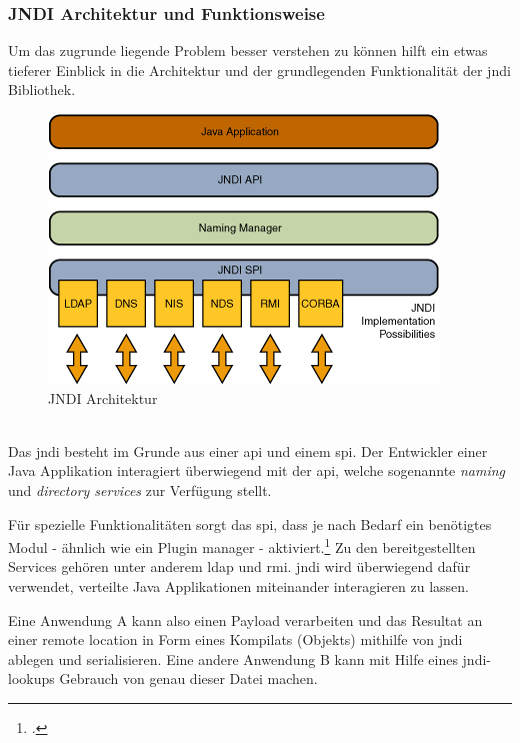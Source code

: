 \subsubsection{JNDI Architektur und Funktionsweise}

Um das zugrunde liegende Problem besser verstehen zu können hilft ein etwas tieferer Einblick in die Architektur
und der grundlegenden Funktionalität der \gls{jndi} Bibliothek.
\begin{figure}[!htb]\label{fig:jndiarch} %
    \begin{center}
        \includegraphics[scale=0.75]{images/jndiarch}
    \end{center}
    \caption{JNDI Architektur}
\end{figure}
\\
Das \gls{jndi} besteht im Grunde aus einer \gls{api} und einem \gls{spi}.
Der Entwickler einer Java Applikation interagiert überwiegend mit der \gls{api}, welche sogenannte \textit{naming} und \textit{directory services} zur Verfügung stellt.

Für spezielle Funktionalitäten sorgt das \gls{spi}, dass je nach Bedarf ein benötigtes Modul - ähnlich wie ein Plugin manager - aktiviert.\footcite{JNDIArchitektur}
Zu den bereitgestellten Services gehören unter anderem \gls{ldap} und \gls{rmi}.
\gls{jndi} wird überwiegend dafür verwendet, verteilte Java Applikationen miteinander interagieren zu lassen.

Eine Anwendung A kann also einen Payload verarbeiten und das Resultat an einer remote location in Form eines Kompilats (Objekts) mithilfe von \gls{jndi} ablegen und serialisieren.
Eine andere Anwendung B kann mit Hilfe eines \gls{jndi}-lookups Gebrauch von genau dieser Datei machen.

